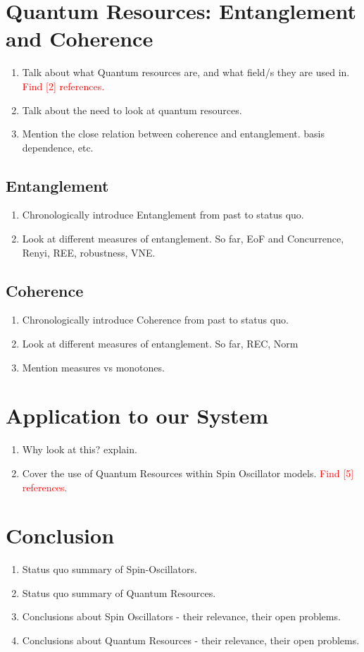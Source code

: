 \documentclass{article}
\begin{document}
\section{Quantum Resources: Entanglement and Coherence}

\begin{enumerate}
    \item Talk about what Quantum resources are, and what field/s they are used in. \textcolor{red}{Find [2] references.}
    \item Talk about the need to look at quantum resources. 
    \item Mention the close relation between coherence and entanglement. basis dependence, etc. 
\end{enumerate}

\subsection{Entanglement}
\begin{enumerate}
    \item Chronologically introduce Entanglement from past to status quo.
    \item Look at different measures of entanglement. So far, EoF and Concurrence, Renyi, REE, robustness, VNE.
\end{enumerate}

\subsection{Coherence}
\begin{enumerate}
    \item Chronologically introduce Coherence from past to status quo.
    \item Look at different measures of entanglement. So far, REC, Norm 
    \item Mention measures vs monotones.
\end{enumerate}

\section{Application to our System}
\begin{enumerate}
    \item Why look at this? explain. 
    \item Cover the use of Quantum Resources within Spin Oscillator models. \textcolor{red}{Find [5] references.}
\end{enumerate}

\section{Conclusion}
\begin{enumerate}
    \item Status quo summary of Spin-Oscillators.
    \item Status quo summary of Quantum Resources. 
    \item Conclusions about Spin Oscillators - their relevance, their open problems.
    \item Conclusions about Quantum Resources - their relevance, their open problems. 
\end{enumerate}
\end{document}
